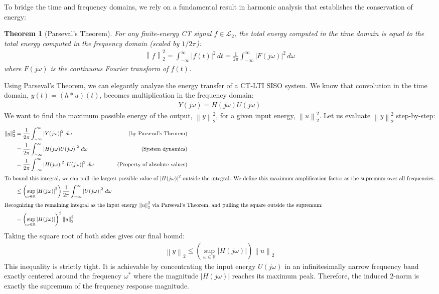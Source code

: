 \documentclass[11pt, a4paper, twoside]{article}
\newcommand{\norm}[1]{\left\lVert#1\right\rVert}
\newcommand{\abs}[1]{\left\lvert#1\right\rvert}
\newcounter{lecnum}
\theoremstyle{plain}
\newtheorem{theorem}{Theorem}[lecnum]
\theoremstyle{definition}
\begin{document}
To bridge the time and frequency domains, we rely on a fundamental result in harmonic analysis that establishes the conservation of energy:

\begin{theorem}[Parseval's Theorem]
For any finite-energy CT signal $f \in \mathcal{L}_2$, the total energy computed in the time domain is equal to the total energy computed in the frequency domain (scaled by $1/2\pi$):
\begin{align*}
    \norm{f}_2^2 = \int_{-\infty}^{\infty} \abs{f(t)}^2 \, dt = \frac{1}{2\pi} \int_{-\infty}^{\infty} \abs{F(j\omega)}^2 \, d\omega
\end{align*}
where $F(j\omega)$ is the continuous Fourier transform of $f(t)$.
\end{theorem}

Using Parseval's Theorem, we can elegantly analyze the energy transfer of a CT-LTI SISO system. We know that convolution in the time domain, $y(t) = (h * u)(t)$, becomes multiplication in the frequency domain:
%
\begin{align*}
    Y(j\omega) = H(j\omega) U(j\omega)
\end{align*}
%
We want to find the maximum possible energy of the output, $\norm{y}_2^2$, for a given input energy, $\norm{u}_2^2$. Let us evaluate $\norm{y}_2^2$ step-by-step:
%
\begin{align*}
    \norm{y}_2^2 &= \frac{1}{2\pi} \int_{-\infty}^{\infty} \abs{Y(j\omega)}^2 \, d\omega \quad &\text{(by Parseval's Theorem)} \\
    &= \frac{1}{2\pi} \int_{-\infty}^{\infty} \abs{H(j\omega) U(j\omega)}^2 \, d\omega \quad &\text{(System dynamics)} \\
    &= \frac{1}{2\pi} \int_{-\infty}^{\infty} \abs{H(j\omega)}^2 \abs{U(j\omega)}^2 \, d\omega \quad &\text{(Property of absolute values)} \\
    \intertext{To bound this integral, we can pull the largest possible value of $\abs{H(j\omega)}^2$ outside the integral. We define this maximum amplification factor as the supremum over all frequencies:}
    &\leq \left( \sup_{\omega \in \mathbb{R}} \abs{H(j\omega)}^2 \right) \frac{1}{2\pi} \int_{-\infty}^{\infty} \abs{U(j\omega)}^2 \, d\omega \\
    \intertext{Recognizing the remaining integral as the input energy $\norm{u}_2^2$ via Parseval's Theorem, and pulling the square outside the supremum:}
    &= \left( \sup_{\omega \in \mathbb{R}} \abs{H(j\omega)} \right)^2 \norm{u}_2^2
\end{align*}
%
Taking the square root of both sides gives our final bound:
%
\begin{align*}
    \norm{y}_2 \leq \left( \sup_{\omega \in \mathbb{R}} \abs{H(j\omega)} \right) \norm{u}_2
\end{align*}
%
This inequality is strictly tight. It is achievable by concentrating the input energy $U(j\omega)$ in an infinitesimally narrow frequency band exactly centered around the frequency $\omega^*$ where the magnitude $\abs{H(j\omega)}$ reaches its maximum peak. Therefore, the induced $2$-norm is exactly the supremum of the frequency response magnitude.
\end{document}
